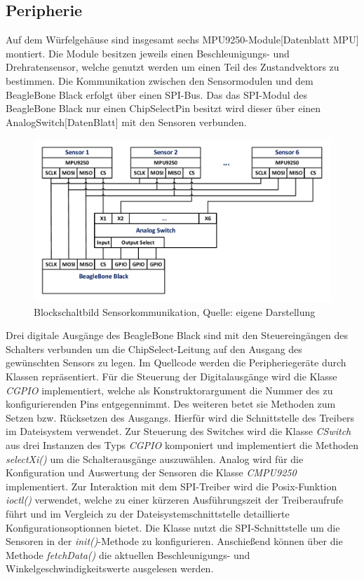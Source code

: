 \subsection{Peripherie}
Auf dem Würfelgehäuse sind insgesamt sechs MPU9250-Module[Datenblatt MPU] montiert. Die Module besitzen jeweils einen Beschleunigungs- und Drehratensensor, welche genutzt werden um einen Teil des Zustandvektors zu bestimmen. Die Kommunikation zwischen den Sensormodulen und dem BeagleBone Black erfolgt über einen SPI-Bus. Das das SPI-Modul des BeagleBone Black nur einen ChipSelectPin besitzt wird dieser über einen AnalogSwitch[DatenBlatt] mit den Sensoren verbunden.
\begin{figure}[!h]
\centering
\includegraphics[width=0.7\linewidth]{img/SW_0_Sensoren_BSB.pdf}
\caption{Blockschaltbild Sensorkommunikation, Quelle: eigene Darstellung}
\end{figure}
Drei digitale Ausgänge des BeagleBone Black sind mit den Steuereingängen des Schalters verbunden um die ChipSelect-Leitung auf den Ausgang des gewünschten Sensors zu legen.
Im Quellcode werden die Peripheriegeräte durch Klassen repräsentiert. Für die Steuerung der Digitalausgänge wird die Klasse \textit{CGPIO} implementiert, welche als Konstruktorargument die Nummer des zu konfigurierenden Pins entgegennimmt. Des weiteren betet sie Methoden zum Setzen bzw. Rücksetzen des Ausgangs. Hierfür wird die Schnittstelle des Treibers im Dateisystem verwendet. Zur Steuerung des Switches wird die Klasse \textit{CSwitch} aus drei Instanzen des Typs \textit{CGPIO} komponiert und implementiert die Methoden \textit{selectXi()} um die Schalterausgänge auszuwählen.
Analog wird für die Konfiguration und Auswertung der Sensoren die Klasse \textit{CMPU9250} implementiert. Zur Interaktion mit dem SPI-Treiber wird die Posix-Funktion \textit{ioctl()} verwendet, welche zu einer kürzeren Ausführungszeit der Treiberaufrufe führt und im Vergleich zu der Dateisystemschnittstelle detaillierte Konfigurationsoptionnen bietet. Die Klasse nutzt die SPI-Schnittstelle um die Sensoren in der \textit{init()}-Methode zu konfigurieren. Anschießend können über die Methode \textit{fetchData()} die aktuellen Beschleunigungs- und Winkelgeschwindigkeitswerte ausgelesen werden.


